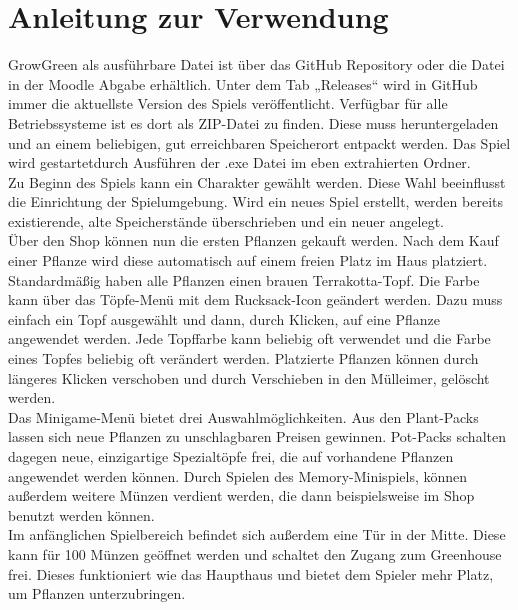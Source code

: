 \chapter{Anleitung zur Verwendung}\label{ch:anleitung}
GrowGreen als ausführbare Datei ist über das GitHub Repository oder die Datei in der Moodle Abgabe erhältlich. 
Unter dem Tab „Releases“ wird in GitHub immer die aktuellste Version des Spiels veröffentlicht. Verfügbar für alle Betriebssysteme ist es dort als 
ZIP-Datei zu finden. 
Diese muss heruntergeladen und an einem beliebigen, gut erreichbaren Speicherort entpackt werden. 
Das Spiel wird gestartetdurch Ausführen der .exe Datei im eben extrahierten Ordner.\\
\newline
Zu Beginn des Spiels kann ein Charakter gewählt werden. 
Diese Wahl beeinflusst die Einrichtung der Spielumgebung. 
Wird ein neues Spiel erstellt, werden bereits existierende, alte Speicherstände überschrieben und ein neuer angelegt.\\
\newline
Über den Shop können nun die ersten Pflanzen gekauft werden. 
Nach dem Kauf einer Pflanze wird diese automatisch auf einem freien Platz im Haus platziert. 
Standardmäßig haben alle Pflanzen einen brauen Terrakotta-Topf. Die Farbe kann über das Töpfe-Menü mit dem Rucksack-Icon 
geändert werden. 
Dazu muss einfach ein Topf ausgewählt und dann, durch Klicken, auf eine Pflanze angewendet werden. 
Jede Topffarbe kann beliebig oft verwendet und die Farbe eines Topfes beliebig oft verändert werden. 
Platzierte Pflanzen können durch längeres Klicken verschoben und durch Verschieben in den Mülleimer, 
gelöscht werden.\\
\newline
Das Minigame-Menü bietet drei Auswahlmöglichkeiten. 
Aus den Plant-Packs lassen sich neue Pflanzen zu unschlagbaren Preisen gewinnen. 
Pot-Packs schalten dagegen neue, einzigartige Spezialtöpfe frei, die auf vorhandene Pflanzen angewendet werden können. 
Durch Spielen des Memory-Minispiels, können außerdem weitere Münzen verdient werden, die dann beispielsweise im Shop benutzt 
werden können.\\
\newline
Im anfänglichen Spielbereich befindet sich außerdem eine Tür in der Mitte. 
Diese kann für 100 Münzen geöffnet werden und schaltet den Zugang zum Greenhouse frei. 
Dieses funktioniert wie das Haupthaus und bietet dem Spieler mehr Platz, um Pflanzen unterzubringen.\\
